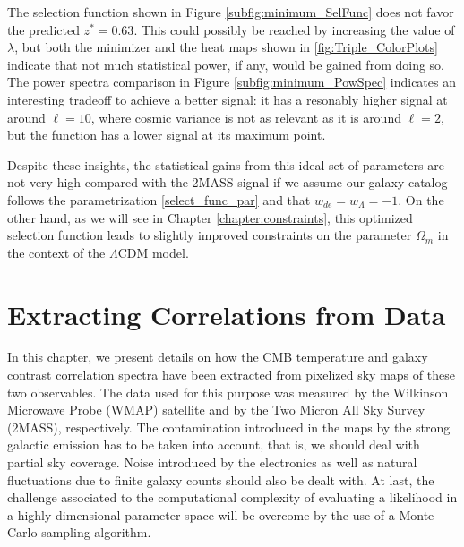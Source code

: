 \documentclass[openany,a4paper,12pt,oneside]{book}
\begin{document}
\begin{spacing}{1.5}
The selection function shown in Figure \ref{subfig:minimum_SelFunc} does not favor the predicted $z^*=0.63$. This could possibly be reached by increasing the value of $\lambda$, but both the minimizer and the heat maps shown in \ref{fig:Triple_ColorPlots} indicate that not much statistical power, if any, would be gained from doing so. The power spectra comparison in Figure \ref{subfig:minimum_PowSpec} indicates an interesting tradeoff to achieve a better signal: it has a resonably higher signal at around $\ell=10$, where cosmic variance is not as relevant as it is around $\ell=2$, but the function has a lower signal at its maximum point.

Despite these insights, the statistical gains from this ideal set of parameters are not very high compared with the 2MASS signal if we assume our galaxy catalog follows the parametrization \eqref{select_func_par} and that $w_{de}=w_\Lambda=-1$. On the other hand, as we will see in Chapter \ref{chapter:constraints}, this optimized selection function leads to slightly improved constraints on the parameter $\Omega_m$ in the context of the $\Lambda$CDM model.

\chapter{Extracting Correlations from Data} \label{chapter:extracting_correlations_from_data}


In this chapter, we present details on how the CMB temperature and galaxy contrast correlation spectra have been extracted from pixelized sky maps of these two observables. The data used for this purpose was measured by the Wilkinson Microwave Probe (WMAP) satellite and by the Two Micron All Sky Survey (2MASS), respectively. The contamination introduced in the maps by the strong galactic emission has to be taken into account, that is, we should deal with partial sky coverage. Noise introduced by the electronics as well as natural fluctuations due to finite galaxy counts should also be dealt with. At last, the challenge associated to the computational complexity of evaluating a likelihood in a highly dimensional parameter space will be overcome by the use of a Monte Carlo sampling algorithm.


\end{spacing}
\end{document}
